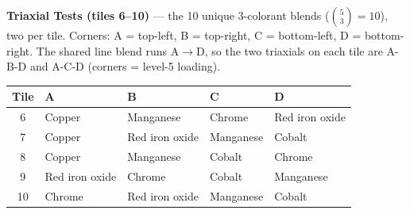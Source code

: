 \documentclass[11pt]{article}
\begin{document}
\vspace{2em}

\noindent\textbf{Triaxial Tests (tiles 6--10)} --- the 10 unique 3-colorant blends
($\binom{5}{3}=10$), two per tile. Corners: A = top-left, B = top-right,
C = bottom-left, D = bottom-right. The shared line blend runs A$\rightarrow$D, so the
two triaxials on each tile are A-B-D and A-C-D (corners = level-5 loading).

\vspace{0.6em}
\noindent\begin{tabular}{c l l l l}
	\hline
	\textbf{Tile} & \textbf{A}     & \textbf{B}     & \textbf{C} & \textbf{D}     \\
	\hline
	6             & Copper         & Manganese      & Chrome     & Red iron oxide \\
	7             & Copper         & Red iron oxide & Manganese  & Cobalt         \\
	8             & Copper         & Manganese      & Cobalt     & Chrome         \\
	9             & Red iron oxide & Chrome         & Cobalt     & Manganese      \\
	10            & Chrome         & Red iron oxide & Manganese  & Cobalt         \\
	\hline
\end{tabular}
\end{document}
